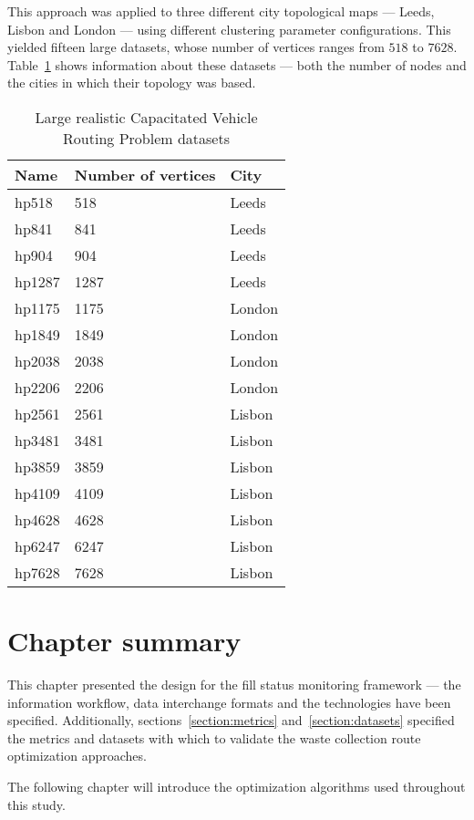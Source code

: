 This approach was applied to three different city topological maps --- Leeds,
Lisbon and London --- using different clustering parameter configurations. This
yielded fifteen large datasets, whose number of vertices ranges from $518$ to
$7628$. Table~\ref{tab:large-datasets} shows information about these datasets
--- both the number of nodes and the cities in which their topology was based.

\begin{table}[h!]
  \caption{Large realistic Capacitated Vehicle Routing Problem datasets}
  \begin{center}
    \begin{tabular}{lll}
      \hline
      Name & Number of vertices & City \\
      \hline
      hp518 & 518 & Leeds \\
      hp841 & 841 & Leeds \\
      hp904 & 904 & Leeds \\
      hp1287 & 1287 & Leeds \\

      hp1175 & 1175 & London \\
      hp1849 & 1849 & London \\
      hp2038 & 2038 & London \\
      hp2206 & 2206 & London \\

      hp2561 & 2561 & Lisbon \\
      hp3481 & 3481 & Lisbon \\
      hp3859 & 3859 & Lisbon \\
      hp4109 & 4109 & Lisbon \\
      hp4628 & 4628 & Lisbon \\
      hp6247 & 6247 & Lisbon \\
      hp7628 & 7628 & Lisbon \\
      \hline
    \end{tabular}
  \end{center}
  \label{tab:large-datasets}
\end{table}

\section{Chapter summary}
\label{section:implementation-summary}

This chapter presented the design for the fill status monitoring framework ---
the information workflow, data interchange formats and the technologies have
been specified. Additionally, sections~\ref{section:metrics}
and~\ref{section:datasets} specified the metrics and datasets with which to
validate the waste collection route optimization approaches.

The following chapter will introduce the optimization algorithms used throughout
this study.

